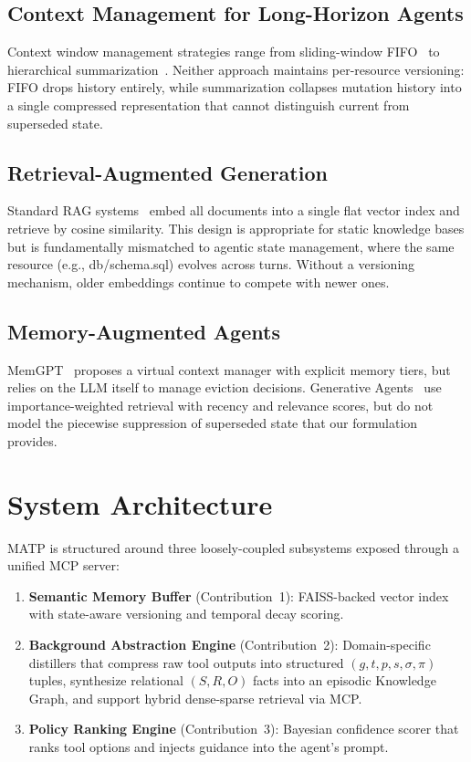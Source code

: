 \documentclass[lettersize,journal]{IEEEtran}
\begin{document}
\subsection{Context Management for Long-Horizon Agents}
Context window management strategies range from sliding-window FIFO~\cite{shinn2023reflexion} to hierarchical summarization~\cite{park2023generative}. Neither approach maintains per-resource versioning: FIFO drops history entirely, while summarization collapses mutation history into a single compressed representation that cannot distinguish current from superseded state.

\subsection{Retrieval-Augmented Generation}
Standard RAG systems~\cite{lewis2020retrieval} embed all documents into a single flat vector index and retrieve by cosine similarity. This design is appropriate for static knowledge bases but is fundamentally mismatched to agentic state management, where the same resource (e.g., db/schema.sql) evolves across turns. Without a versioning mechanism, older embeddings continue to compete with newer ones.

\subsection{Memory-Augmented Agents}
MemGPT~\cite{packer2023memgpt} proposes a virtual context manager with explicit memory tiers, but relies on the LLM itself to manage eviction decisions. Generative Agents~\cite{park2023generative} use importance-weighted retrieval with recency and relevance scores, but do not model the piecewise suppression of superseded state that our formulation provides.

\section{System Architecture}

MATP is structured around three loosely-coupled subsystems exposed through a unified MCP server:

\begin{enumerate}
    \item \textbf{Semantic Memory Buffer} (Contribution~1): FAISS-backed vector index with state-aware versioning and temporal decay scoring.
    \item \textbf{Background Abstraction Engine} (Contribution~2): Domain-specific distillers that compress raw tool outputs into structured $(g, t, p, s, \sigma, \pi)$ tuples, synthesize relational $(S, R, O)$ facts into an episodic Knowledge Graph, and support hybrid dense-sparse retrieval via MCP.
    \item \textbf{Policy Ranking Engine} (Contribution~3): Bayesian confidence scorer that ranks tool options and injects guidance into the agent's prompt.
\end{enumerate}
\end{document}
